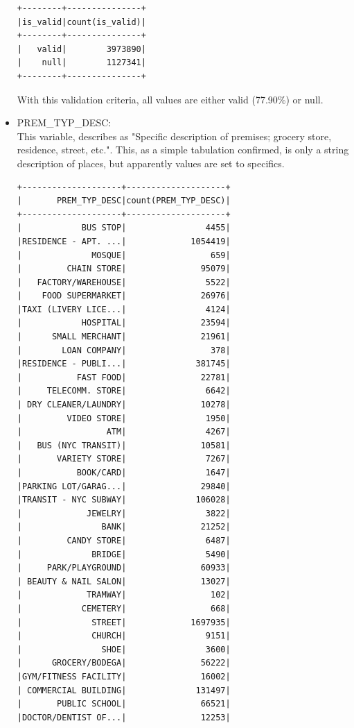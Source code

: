 \documentclass{article}
\begin{document}
\begin{itemize}
\begin{verbatim}
+--------+---------------+
|is_valid|count(is_valid)|
+--------+---------------+
|   valid|        3973890|
|    null|        1127341|
+--------+---------------+
\end{verbatim}

With this validation criteria, all values are either valid (77.90\%) or null. 

\item PREM\_TYP\_DESC: \\
This variable, describes as "Specific description of premises; grocery store, residence, street, etc.". This, as a simple tabulation confirmed, is only a string description of places, but apparently values are set to specifics. 

\begin{verbatim}
+--------------------+--------------------+                                     
|       PREM_TYP_DESC|count(PREM_TYP_DESC)|
+--------------------+--------------------+
|            BUS STOP|                4455|
|RESIDENCE - APT. ...|             1054419|
|              MOSQUE|                 659|
|         CHAIN STORE|               95079|
|   FACTORY/WAREHOUSE|                5522|
|    FOOD SUPERMARKET|               26976|
|TAXI (LIVERY LICE...|                4124|
|            HOSPITAL|               23594|
|      SMALL MERCHANT|               21961|
|        LOAN COMPANY|                 378|
|RESIDENCE - PUBLI...|              381745|
|           FAST FOOD|               22781|
|     TELECOMM. STORE|                6642|
| DRY CLEANER/LAUNDRY|               10278|
|         VIDEO STORE|                1950|
|                 ATM|                4267|
|   BUS (NYC TRANSIT)|               10581|
|       VARIETY STORE|                7267|
|           BOOK/CARD|                1647|
|PARKING LOT/GARAG...|               29840|
|TRANSIT - NYC SUBWAY|              106028|
|             JEWELRY|                3822|
|                BANK|               21252|
|         CANDY STORE|                6487|
|              BRIDGE|                5490|
|     PARK/PLAYGROUND|               60933|
| BEAUTY & NAIL SALON|               13027|
|             TRAMWAY|                 102|
|            CEMETERY|                 668|
|              STREET|             1697935|
|              CHURCH|                9151|
|                SHOE|                3600|
|      GROCERY/BODEGA|               56222|
|GYM/FITNESS FACILITY|               16002|
| COMMERCIAL BUILDING|              131497|
|       PUBLIC SCHOOL|               66521|
|DOCTOR/DENTIST OF...|               12253|

\end{verbatim}
\end{itemize}
\end{document}
